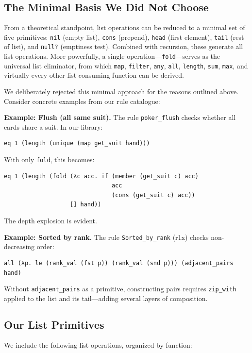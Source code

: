\documentclass[11pt]{article}
\begin{document}
\subsection{The Minimal Basis We Did Not Choose}

From a theoretical standpoint, list operations can be reduced to a minimal set of five primitives: \texttt{nil} (empty list), \texttt{cons} (prepend), \texttt{head} (first element), \texttt{tail} (rest of list), and \texttt{null?} (emptiness test). Combined with recursion, these generate all list operations. More powerfully, a single operation---\texttt{fold}---serves as the universal list eliminator, from which \texttt{map}, \texttt{filter}, \texttt{any}, \texttt{all}, \texttt{length}, \texttt{sum}, \texttt{max}, and virtually every other list-consuming function can be derived.

We deliberately rejected this minimal approach for the reasons outlined above. Consider concrete examples from our rule catalogue:

\medskip
\noindent\textbf{Example: Flush (all same suit).} The rule \texttt{poker\_flush} checks whether all cards share a suit. In our library:
\begin{lstlisting}[style=dsl]
eq 1 (length (unique (map get_suit hand)))
\end{lstlisting}
With only \texttt{fold}, this becomes:
\begin{lstlisting}[style=dsl]
eq 1 (length (fold (λc acc. if (member (get_suit c) acc) 
                               acc 
                               (cons (get_suit c) acc)) 
                   [] hand))
\end{lstlisting}
The depth explosion is evident.

\medskip
\noindent\textbf{Example: Sorted by rank.} The rule \texttt{Sorted\_by\_rank} (r1x) checks non-decreasing order:
\begin{lstlisting}[style=dsl]
all (λp. le (rank_val (fst p)) (rank_val (snd p))) (adjacent_pairs hand)
\end{lstlisting}
Without \texttt{adjacent\_pairs} as a primitive, constructing pairs requires \texttt{zip\_with} applied to the list and its tail---adding several layers of composition.

\subsection{Our List Primitives}

We include the following list operations, organized by function:
\end{document}
